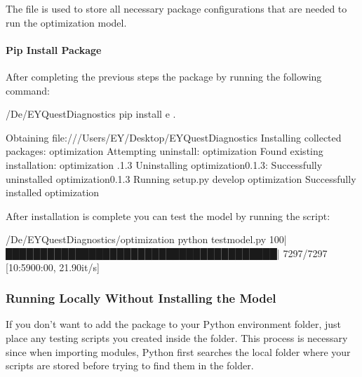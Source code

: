 \documentclass[letterpaper,10pt,english]{sphinxmanual}
\begin{document}
The file  is used to store all necessary package configurations that are needed to run the optimization model.


\paragraph{Pip Install Package}
\label{\detokenize{source/guides:pip-install-package}}
After completing the previous steps  the package by running the following command:
\def\sphinxLiteralBlockLabel{\label{\detokenize{source/guides:id5}}}
\begin{sphinxVerbatim}[commandchars=\\\{\},numbers=left,firstnumber=1,stepnumber=1]
\PYGZti{}/De/EY\PYGZhy{}Quest\PYGZhy{}Diagnostics pip install \PYGZhy{}e .

Obtaining file:///Users/EY/Desktop/EY\PYGZhy{}Quest\PYGZhy{}Diagnostics
Installing collected packages: optimization
    Attempting uninstall: optimization
        Found existing installation: optimization .1.3
        Uninstalling optimization\PYGZhy{}0.1.3:
        Successfully uninstalled optimization\PYGZhy{}0.1.3
    Running setup.py develop  optimization
Successfully installed optimization
\end{sphinxVerbatim}

After installation is complete you can test the model by running the  script:

\begin{sphinxVerbatim}[commandchars=\\\{\},numbers=left,firstnumber=1,stepnumber=1]
\PYGZti{}/De/EY\PYGZhy{}Quest\PYGZhy{}Diagnostics/optimization  python test\PYGZus{}model.py
\PYGZgt{}\PYGZgt{}\PYGZgt{} 100\PYGZpc{}|███████████████████████████████████████| 7297/7297 [10:59\PYGZlt{}00:00, 21.90it/s]
\end{sphinxVerbatim}


\subsubsection{Running Locally Without Installing the Model}
\label{\detokenize{source/guides:running-locally-without-installing-the-model}}
If you don’t want to add the package to your Python environment  folder, just place any testing scripts you created inside the  folder.
This process is necessary since when importing modules, Python first searches the local folder where your scripts are stored before trying to find them in the  folder.
\end{document}

